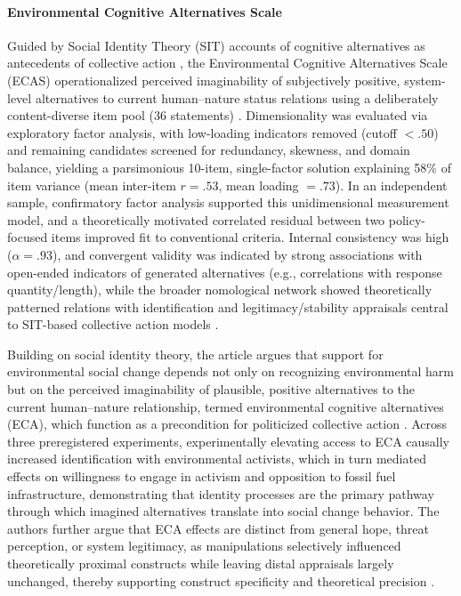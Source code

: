 \documentclass[jou,floatsintext]{apa7}
\begin{document}
\paragraph{Environmental Cognitive Alternatives Scale}

Guided by Social Identity Theory (SIT) accounts of cognitive alternatives as antecedents of collective action \parencite{turnerSocialComparisonGroup1979}, the Environmental Cognitive Alternatives Scale (ECAS) operationalized perceived imaginability of subjectively positive, system-level alternatives to current human--nature status relations using a deliberately content-diverse item pool (36 statements) \parencite{wrightImaginingSustainableWorld2020}. Dimensionality was evaluated via exploratory factor analysis, with low-loading indicators removed (cutoff $<.50$) and remaining candidates screened for redundancy, skewness, and domain balance, yielding a parsimonious 10-item, single-factor solution explaining 58\% of item variance (mean inter-item $r=.53$, mean loading $=.73$). In an independent sample, confirmatory factor analysis supported this unidimensional measurement model, and a theoretically motivated correlated residual between two policy-focused items improved fit to conventional criteria. Internal consistency was high ($\alpha=.93$), and convergent validity was indicated by strong associations with open-ended indicators of generated alternatives (e.g., correlations with response quantity/length), while the broader nomological network showed theoretically patterned relations with identification and legitimacy/stability appraisals central to SIT-based collective action models \parencite{wrightImaginingSustainableWorld2020}.

Building on social identity theory, the article argues that support for environmental social change depends not only on recognizing environmental harm but on the perceived imaginability of plausible, positive alternatives to the current human–nature relationship, termed environmental cognitive alternatives (ECA), which function as a precondition for politicized collective action \parencite[ECA first came up by SIT, see:][]{turnerSocialComparisonGroup1979}. Across three preregistered experiments, experimentally elevating access to ECA causally increased identification with environmental activists, which in turn mediated effects on willingness to engage in activism and opposition to fossil fuel infrastructure, demonstrating that identity processes are the primary pathway through which imagined alternatives translate into social change behavior. The authors further argue that ECA effects are distinct from general hope, threat perception, or system legitimacy, as manipulations selectively influenced theoretically proximal constructs while leaving distal appraisals largely unchanged, thereby supporting construct specificity and theoretical precision \parencite{lutzExperimentallyElevatingEnvironmental2025}. 
\end{document}
